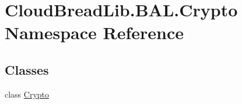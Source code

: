 \hypertarget{a00427}{}\section{Cloud\+Bread\+Lib.\+B\+A\+L.\+Crypto Namespace Reference}
\label{a00427}
\subsection*{Classes}
\begin{DoxyCompactItemize}
\item 
class \hyperlink{a00072}{Crypto}
\end{DoxyCompactItemize}
